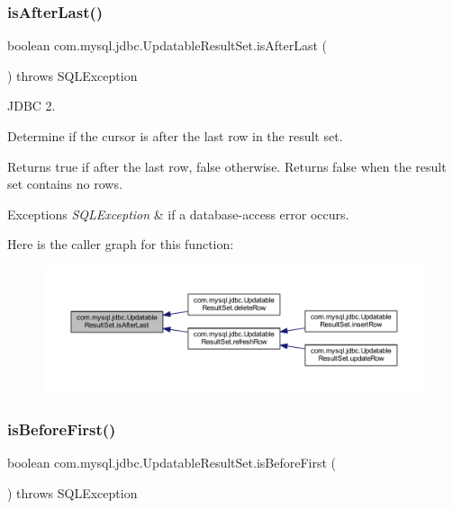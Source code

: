 \subsubsection{\texorpdfstring{is\+After\+Last()}{isAfterLast()}}
{\footnotesize\ttfamily boolean com.\+mysql.\+jdbc.\+Updatable\+Result\+Set.\+is\+After\+Last (\begin{DoxyParamCaption}{ }\end{DoxyParamCaption}) throws S\+Q\+L\+Exception}

J\+D\+BC 2.

Determine if the cursor is after the last row in the result set. 

\begin{DoxyReturn}{Returns}
true if after the last row, false otherwise. Returns false when the result set contains no rows.
\end{DoxyReturn}

\begin{DoxyExceptions}{Exceptions}
{\em S\+Q\+L\+Exception} & if a database-\/access error occurs. \\
\hline
\end{DoxyExceptions}
Here is the caller graph for this function\+:
\nopagebreak
\begin{figure}[H]
\begin{center}
\leavevmode
\includegraphics[width=350pt]{classcom_1_1mysql_1_1jdbc_1_1_updatable_result_set_a065b1afc8c2a8c2370877d34ba2fc5ed_icgraph}
\end{center}
\end{figure}
\mbox{\label{classcom_1_1mysql_1_1jdbc_1_1_updatable_result_set_acfe073e7f4e48053b2d5c7fe990fb4d4}} 
\subsubsection{\texorpdfstring{is\+Before\+First()}{isBeforeFirst()}}
{\footnotesize\ttfamily boolean com.\+mysql.\+jdbc.\+Updatable\+Result\+Set.\+is\+Before\+First (\begin{DoxyParamCaption}{ }\end{DoxyParamCaption}) throws S\+Q\+L\+Exception}

